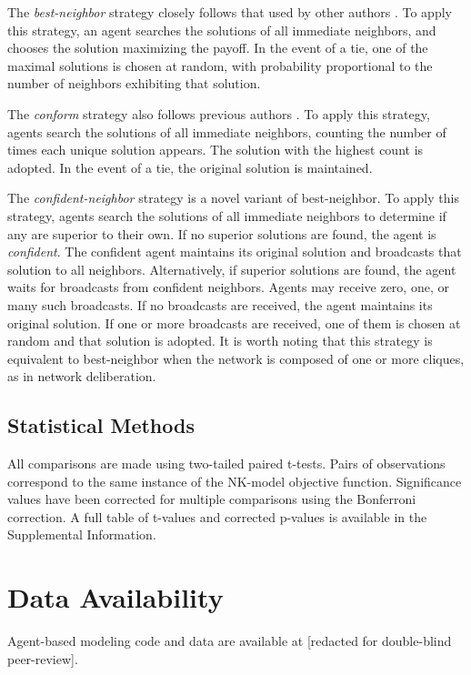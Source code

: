 \documentclass[twocolumn,10pt]{article}
\begin{document}
The {\em best-neighbor} strategy closely follows that used by other authors \cite{lazer_network_2007, barkoczi_social_2016}. To apply this strategy, an agent searches the solutions of all immediate neighbors, and chooses the solution maximizing the payoff. In the event of a tie, one of the maximal solutions is chosen at random, with probability proportional to the number of neighbors exhibiting that solution.

The {\em conform} strategy also follows previous authors \cite{barkoczi_social_2016}. To apply this strategy, agents search the solutions of all immediate neighbors, counting the number of times each unique solution appears. The solution with the highest count is adopted. In the event of a tie, the original solution is maintained.

The {\em confident-neighbor} strategy is a novel variant of best-neighbor. To apply this strategy, agents search the solutions of all immediate neighbors to determine if any are superior to their own. If no superior solutions are found, the agent is {\em confident}. The confident agent maintains its original solution and broadcasts that solution to all neighbors. Alternatively, if superior solutions are found, the agent waits for broadcasts from confident neighbors. Agents may receive zero, one, or many such broadcasts. If no broadcasts are received, the agent maintains its original solution. If one or more broadcasts are received, one of them is chosen at random and that solution is adopted. It is worth noting that this strategy is equivalent to best-neighbor when the network is composed of one or more cliques, as in network deliberation.

\subsection{Statistical Methods}
All comparisons are made using two-tailed paired t-tests. Pairs of observations correspond to the same instance of the NK-model objective function. Significance values have been corrected for multiple comparisons using the Bonferroni correction. A full table of t-values and corrected p-values is available in the Supplemental Information.

\section{Data Availability}
Agent-based modeling code and data are available at
[redacted for double-blind peer-review].
\end{document}
